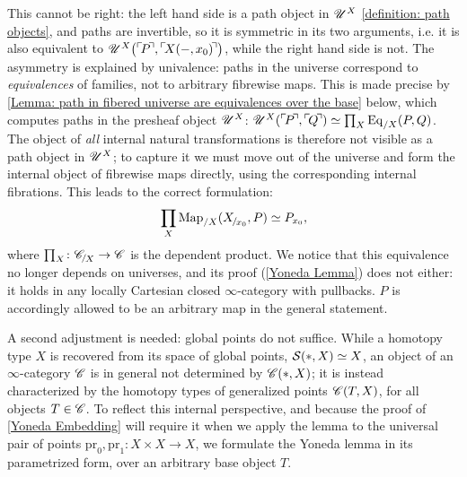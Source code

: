 \documentclass[twoside,a4paper,11pt]{amsart}
\begin{document}
This cannot be right: the left hand side is a path object in $\mathscr{U}^X$ \eqref{definition: path objects}, and paths are invertible, so it is symmetric in its two arguments, i.e. it is also equivalent to $\U^X\big(\corner{P},\corner{X(-,x_0)}\big)$, while the right hand side is not. The asymmetry is explained by univalence: paths in the universe correspond to \emph{equivalences} of families, not to arbitrary fibrewise maps. This is made precise by \cref{Lemma: path in fibered universe are equivalences over the base} below, which computes paths in the presheaf object $\mathscr{U}^X$: $\U^X(\corner{P},\corner{Q})\simeq \prod_X\Eq_{/X}(P,Q)$. The object of \emph{all} internal natural transformations is therefore not visible as a path object in $\mathscr{U}^X$; to capture it we must move out of the universe and form the internal object of fibrewise maps directly, using the corresponding internal fibrations. This leads to the correct formulation:
\[\prod_X\Map_{/X}(\slice{X}{x_0},P)\simeq P_{x_0},\]
where $\prod_X\colon\slice{\C}{X}\to\C$ is the dependent product. We notice that this equivalence no longer depends on universes, and its proof (\cref{Yoneda Lemma}) does not either: it holds in any locally Cartesian closed $\infty$-category with pullbacks. $P$ is accordingly allowed to be an arbitrary map in the general statement.

\medskip

A second adjustment is needed: global points do not suffice. While a homotopy type $X$ is recovered from its space of global points, $\mathcal{S}(\ast,X)\simeq X$, an object of an $\infty$-category $\mathscr{C}$ is in general not determined by $\mathscr{C}(\ast,X)$; it is instead characterized by the homotopy types of generalized points $\mathscr{C}(T,X)$, for all objects $T\in\mathscr{C}$. To reflect this internal perspective, and because the proof of \cref{Yoneda Embedding} will require it when we apply the lemma to the universal pair of points $\mathrm{pr}_0,\mathrm{pr}_1\colon X\times X\to X$, we formulate the Yoneda lemma in its parametrized form, over an arbitrary base object $T$.
\end{document}
